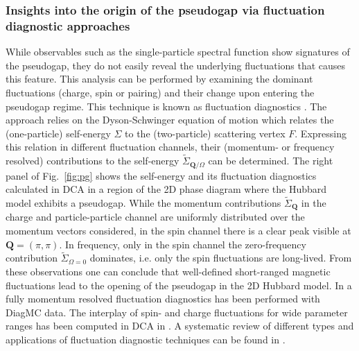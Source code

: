 \documentclass{ar-1col}
\begin{document}
\subsubsection{Insights into the origin of the pseudogap via fluctuation diagnostic approaches}
While observables such as the single-particle spectral function show signatures of the pseudogap, they do not easily reveal the underlying fluctuations that causes this feature. This analysis can be performed by examining the dominant fluctuations (charge, spin or pairing) and their change upon entering the pseudogap regime. This technique is known as  fluctuation diagnostics \cite{Gunnarsson15}. The approach relies on the Dyson-Schwinger equation of motion which relates the (one-particle) self-energy $\Sigma$ to the (two-particle) scattering vertex $F$. Expressing this relation in different fluctuation channels, their (momentum- or frequency resolved) contributions to the self-energy $\tilde{\Sigma}_{\mathbf{Q}/\Omega}$ can be determined. The right panel of Fig.~\ref{fig:pg} shows the self-energy and its fluctuation diagnostics calculated in DCA in a region of the 2D phase diagram where the Hubbard model exhibits a pseudogap. While the momentum contributions $\tilde{\Sigma}_{\mathbf{Q}}$ in the charge and particle-particle channel are uniformly distributed over the momentum vectors considered, in the spin channel there is a clear peak visible at $\mathbf{Q}=(\pi,\pi)$. In frequency, only in the spin channel the zero-frequency contribution $\tilde{\Sigma}_{\Omega=0}$ dominates, i.e. only the spin fluctuations are long-lived. From these observations one can conclude that well-defined short-ranged magnetic fluctuations lead to the opening of the pseudogap in the 2D Hubbard model. In \cite{Wu17} a fully momentum resolved fluctuation diagnostics has been performed with DiagMC data. The interplay of spin- and charge fluctuations for wide parameter ranges has been computed in DCA in \cite{Dong20}. A systematic review of different types and applications of fluctuation diagnostic techniques can be found in \cite{Schaefer21B}.
\end{document}
